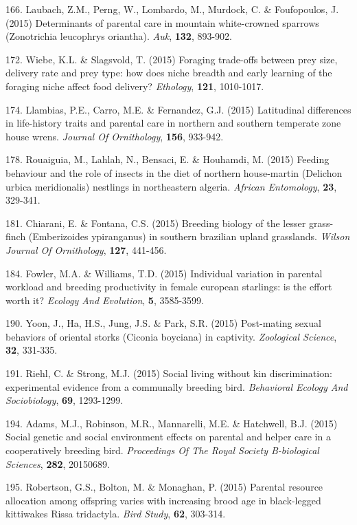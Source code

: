 166. Laubach, Z.M., Perng, W., Lombardo, M., Murdock, C. \&  Foufopoulos, J. (2015) Determinants of parental care in mountain white-crowned sparrows (Zonotrichia leucophrys oriantha). \textit{Auk},  \textbf{132}, 893-902.

172. Wiebe, K.L. \&  Slagsvold, T. (2015) Foraging trade-offs between prey size, delivery rate and prey type: how does niche breadth and early learning of the foraging niche affect food delivery? \textit{Ethology},  \textbf{121}, 1010-1017.

174. Llambias, P.E., Carro, M.E. \&  Fernandez, G.J. (2015) Latitudinal differences in life-history traits and parental care in northern and southern temperate zone house wrens. \textit{Journal Of Ornithology},  \textbf{156}, 933-942.

178. Rouaiguia, M., Lahlah, N., Bensaci, E. \&  Houhamdi, M. (2015) Feeding behaviour and the role of insects in the diet of northern house-martin (Delichon urbica meridionalis) nestlings in northeastern algeria. \textit{African Entomology},  \textbf{23}, 329-341.

181. Chiarani, E. \&  Fontana, C.S. (2015) Breeding biology of the lesser grass-finch (Emberizoides ypiranganus) in southern brazilian upland grasslands. \textit{Wilson Journal Of Ornithology},  \textbf{127}, 441-456.

184. Fowler, M.A. \&  Williams, T.D. (2015) Individual variation in parental workload and breeding productivity in female european starlings: is the effort worth it? \textit{Ecology And Evolution},  \textbf{5}, 3585-3599.

190. Yoon, J., Ha, H.S., Jung, J.S. \&  Park, S.R. (2015) Post-mating sexual behaviors of oriental storks (Ciconia boyciana) in captivity. \textit{Zoological Science},  \textbf{32}, 331-335.

191. Riehl, C. \&  Strong, M.J. (2015) Social living without kin discrimination: experimental evidence from a communally breeding bird. \textit{Behavioral Ecology And Sociobiology},  \textbf{69}, 1293-1299.

194. Adams, M.J., Robinson, M.R., Mannarelli, M.E. \&  Hatchwell, B.J. (2015) Social genetic and social environment effects on parental and helper care in a cooperatively breeding bird. \textit{Proceedings Of The Royal Society B-biological Sciences},  \textbf{282}, 20150689.

195. Robertson, G.S., Bolton, M. \&  Monaghan, P. (2015) Parental resource allocation among offspring varies with increasing brood age in black-legged kittiwakes Rissa tridactyla. \textit{Bird Study},  \textbf{62}, 303-314.

